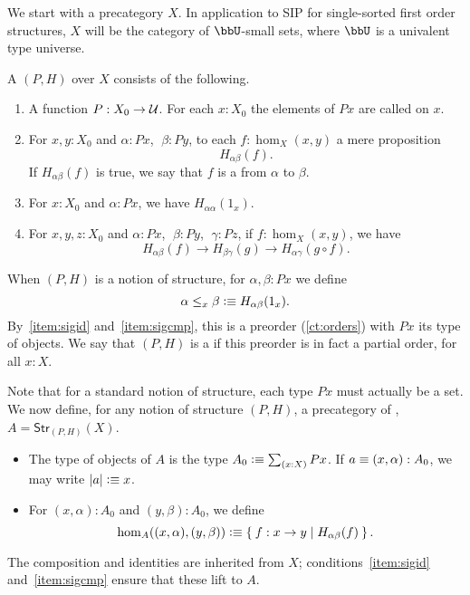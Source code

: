 We start with a precategory $X$.  In application to SIP for
single-sorted first order structures, $X$ will be the category %
of $\bbU$-small sets, where $\bbU$ is a univalent type universe.

\begin{defn}\label{ct:sig}
  A  $(P,H)$ over $X$ consists of the following.
  \begin{enumerate}
  \item A function $P:X_0 \to \mathcal{U}$.
    For each $x:X_0$ the elements of $Px$ are called  on $x$.
  \item For $x,y:X_0$ and $\alpha:Px$, $\;\beta:Py$, to each $f:\hom_X(x,y)$ a mere proposition 
  \[ H_{\alpha\beta}(f).\]
    If $H_{\alpha\beta}(f)$ is true, we say that $f$ is a  from $\alpha$ to $\beta$.
  \item For $x:X_0$ and $\alpha:Px$, we have $H_{\alpha\alpha}(1_x)$.\label{item:sigid}
  \item For $x,y,z:X_0$ and $\alpha:Px$, $\;\beta:Py$, $\;\gamma:Pz$, 
if $f:\hom_X(x,y)$, we have 
  \[ H_{\alpha\beta}(f)\to H_{\beta\gamma}(g)\to H_{\alpha\gamma}(g\circ   f).\]\label{item:sigcmp}  
   \end{enumerate}
  When $(P,H)$ is a notion of structure, for $\alpha,\beta:Px$ we define
  \[ \alpha\leq_x\beta \vcentcolon\equiv H_{\alpha\beta}(1_x).\]
  By~\ref{item:sigid} and~\ref{item:sigcmp}, this is a preorder (\autoref{ct:orders}) with $Px$ its type of objects.
  We say that $(P,H)$ is a  if this preorder is in fact a partial order, for all $x:X$.
\end{defn}

Note that for a standard notion of structure, each type $Px$ must actually be a set.
We now define, for any notion of structure $(P,H)$, a precategory of , $A = \mathsf{Str}_{(P,H)}(X)$.
\begin{itemize}
\item The type of objects of $A$ is the type $A_0 \defeq \sm{x:X} Px$.
  If $a\equiv (x,\alpha):A_0$, we may write $|a| \vcentcolon\equiv x$.
\item For $(x,\alpha):A_0$ and $(y,\beta):A_0$, we define
  \[\hom_A((x,\alpha),(y,\beta)) \vcentcolon\equiv \Set{ f:x \to y | H_{\alpha\beta}(f)}.\]
\end{itemize}
The composition and identities are inherited from $X$; conditions~\ref{item:sigid} and~\ref{item:sigcmp} ensure that these lift to $A$.

